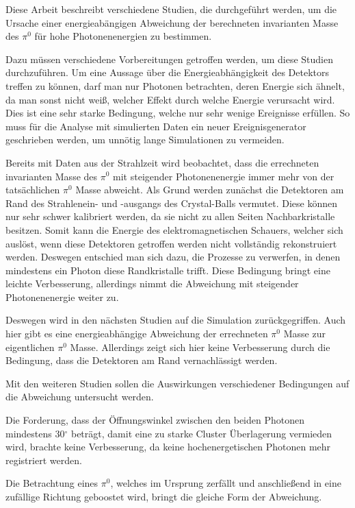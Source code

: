 \documentclass[a4paper,11pt,oneside,final,german,openbib,pdftex]{scrbook}
\begin{document}
{Diese Arbeit beschreibt verschiedene Studien, die durchgef\"uhrt werden, um die Ursache einer energieab\"angigen Abweichung der berechneten invarianten Masse des $\pi^0$ f\"ur hohe Photonenenergien zu bestimmen. 

Dazu m\"ussen verschiedene Vorbereitungen getroffen werden, um diese Studien durchzuf\"uhren. Um eine Aussage \"uber die Energieabh\"angigkeit des Detektors treffen zu k\"onnen, darf man nur Photonen betrachten, deren Energie sich \"ahnelt, da man sonst nicht wei{\ss}, welcher Effekt durch welche Energie verursacht wird. Dies ist eine sehr starke Bedingung, welche nur sehr wenige Ereignisse erf\"ullen. So muss f\"ur die Analyse mit simulierten Daten ein neuer Ereignisgenerator geschrieben werden, um unn\"otig lange Simulationen zu vermeiden.

Bereits mit Daten aus der Strahlzeit wird beobachtet, dass die errechneten invarianten Masse des $\pi^0$ mit steigender Photonenenergie immer mehr von der tats\"achlichen $\pi^0$ Masse abweicht. Als Grund werden zun\"achst die Detektoren am Rand des Strahlenein- und -ausgangs des Crystal-Balls vermutet. Diese k\"onnen nur sehr schwer kalibriert werden, da sie nicht zu allen Seiten Nachbarkristalle besitzen. Somit kann die Energie des elektromagnetischen Schauers, welcher sich ausl\"ost, wenn diese Detektoren getroffen werden nicht vollst\"andig rekonstruiert werden. Deswegen entschied man sich dazu, die Prozesse zu verwerfen, in denen mindestens ein Photon diese Randkristalle trifft. Diese Bedingung bringt eine leichte Verbesserung, allerdings nimmt die Abweichung mit steigender Photonenenergie weiter zu.

Deswegen wird in den n\"achsten Studien auf die Simulation zur\"uckgegriffen. Auch hier gibt es eine energieabh\"angige Abweichung der errechneten $\pi^0$ Masse zur eigentlichen $\pi^0$ Masse. Allerdings zeigt sich hier keine Verbesserung durch die Bedingung, dass die Detektoren am Rand vernachl\"assigt werden.

Mit den weiteren Studien sollen die Auswirkungen verschiedener Bedingungen auf die Abweichung untersucht werden.

Die Forderung, dass der \"Offnungswinkel zwischen den beiden Photonen mindestens 30$^{\circ}$ betr\"agt, damit eine zu starke Cluster \"Uberlagerung vermieden wird, brachte keine Verbesserung, da keine hochenergetischen Photonen mehr registriert werden. 

Die Betrachtung eines $\pi^0$, welches im Ursprung zerf\"allt und anschlie{\ss}end in eine zuf\"allige Richtung geboostet wird, bringt die gleiche Form der Abweichung.

}
\end{document}
